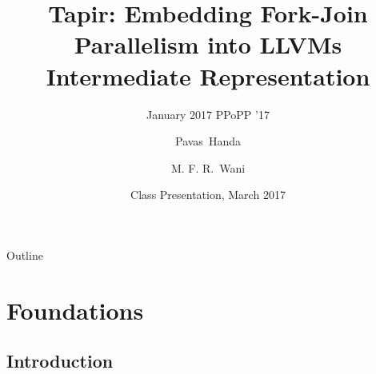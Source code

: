 \documentclass{beamer}
\title[TAPIR]{Tapir: Embedding Fork-Join Parallelism
into LLVM\textquotesingle s Intermediate Representation}
\subtitle{January 2017 PPoPP '17}
\author{Pavas~Handa \and M. F. R.~Wani}
\institute[IIIT-D] %
{
  Department of Computer Science \\
  IIIT-D
}
\date[CSE502 -- March 2017]{Class Presentation, March 2017}
\begin{document}
\begin{frame}
  \titlepage
\end{frame}

\begin{frame}{Outline}
  \tableofcontents
\end{frame}

\section{Foundations}

\subsection{Introduction}
\end{document}
